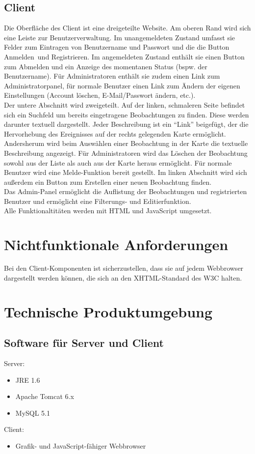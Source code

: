 \documentclass[a4paper,11pt]{scrartcl}
\begin{document}
	\subsection{Client}
		Die Oberfläche des Client ist eine dreigeteilte Website. Am oberen Rand wird sich eine Leiste zur Benutzerverwaltung. Im unangemeldeten Zustand umfasst sie Felder zum Eintragen von Benutzername und Passwort und die die Button \glqq Anmelden\grqq\ und \glqq Registrieren\grqq . Im angemeldeten Zustand enthält sie einen Button zum Abmelden und ein Anzeige des momentanen Status (bspw. der Benutzername). Für Administratoren enthält sie zudem einen Link zum Administratorpanel, für normale Benutzer einen Link zum Ändern der eigenen Einstellungen (Account löschen, E-Mail/Passwort ändern, etc.).\\
		Der untere Abschnitt wird zweigeteilt. Auf der linken, schmaleren Seite befindet sich ein Suchfeld um bereits eingetragene Beobachtungen zu finden. Diese werden darunter textuell dargestellt. Jeder Beschreibung ist ein “Link” beigefügt, der die Hervorhebung des Ereignisses auf der rechts gelegenden Karte ermöglicht. Andersherum wird beim Auswählen einer Beobachtung in der Karte die textuelle Beschreibung angezeigt. Für Administratoren wird das Löschen der Beobachtung sowohl aus der Liste als auch aus der Karte heraus ermöglicht. Für normale Benutzer wird eine Melde-Funktion bereit gestellt. Im linken Abschnitt wird sich außerdem ein Button zum Erstellen einer neuen Beobachtung finden.\\
		Das Admin-Panel ermöglicht die Auflistung der Beobachtungen und registrierten Benutzer und ermöglicht eine Filterungs- und Editierfunktion.\\
		Alle Funktionaltitäten werden mit HTML und JavaScript umgesetzt.
		
\section{Nichtfunktionale Anforderungen}
	Bei den Client-Komponenten ist sicherzustellen, dass sie auf jedem Webbrowser dargestellt werden können, die sich an den XHTML-Standard des W3C halten.
\section{Technische Produktumgebung}
	\subsection{Software für Server und Client}
		Server:
		\begin{itemize}
			\item JRE 1.6
			\item Apache Tomcat 6.x
			\item MySQL 5.1
		\end{itemize}
		Client:
		\begin{itemize}
			\item Grafik- und JavaScript-fähiger Webbrowser
		\end{itemize}
\end{document}
